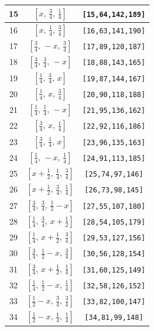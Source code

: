 \documentclass[fleqn,8pt]{jsarticle}
\begin{document}
\begin{longtable}{ccc}
15 & $\left[ x,\, \frac{3}{4},\, \frac{1}{4} \right]$ & {\tt [15,64,142,189]} \\ \hline
16 & $\left[ x,\, \frac{1}{4},\, \frac{3}{4} \right]$ & {\tt [16,63,141,190]} \\ \hline
17 & $\left[ \frac{3}{4},\, - x,\, \frac{3}{4} \right]$ & {\tt [17,89,120,187]} \\ \hline
18 & $\left[ \frac{3}{4},\, \frac{3}{4},\, - x \right]$ & {\tt [18,88,143,165]} \\ \hline
19 & $\left[ \frac{1}{4},\, \frac{3}{4},\, x \right]$ & {\tt [19,87,144,167]} \\ \hline
20 & $\left[ \frac{1}{4},\, x,\, \frac{3}{4} \right]$ & {\tt [20,90,118,188]} \\ \hline
21 & $\left[ \frac{1}{4},\, \frac{1}{4},\, - x \right]$ & {\tt [21,95,136,162]} \\ \hline
22 & $\left[ \frac{3}{4},\, x,\, \frac{1}{4} \right]$ & {\tt [22,92,116,186]} \\ \hline
23 & $\left[ \frac{3}{4},\, \frac{1}{4},\, x \right]$ & {\tt [23,96,135,163]} \\ \hline
24 & $\left[ \frac{1}{4},\, - x,\, \frac{1}{4} \right]$ & {\tt [24,91,113,185]} \\ \hline
25 & $\left[ x + \frac{1}{2},\, \frac{1}{4},\, \frac{3}{4} \right]$ & {\tt [25,74,97,146]} \\ \hline
26 & $\left[ x + \frac{1}{2},\, \frac{3}{4},\, \frac{1}{4} \right]$ & {\tt [26,73,98,145]} \\ \hline
27 & $\left[ \frac{3}{4},\, \frac{3}{4},\, \frac{1}{2} - x \right]$ & {\tt [27,55,107,180]} \\ \hline
28 & $\left[ \frac{1}{4},\, \frac{3}{4},\, x + \frac{1}{2} \right]$ & {\tt [28,54,105,179]} \\ \hline
29 & $\left[ \frac{1}{4},\, x + \frac{1}{2},\, \frac{3}{4} \right]$ & {\tt [29,53,127,156]} \\ \hline
30 & $\left[ \frac{3}{4},\, \frac{1}{2} - x,\, \frac{3}{4} \right]$ & {\tt [30,56,128,154]} \\ \hline
31 & $\left[ \frac{3}{4},\, x + \frac{1}{2},\, \frac{1}{4} \right]$ & {\tt [31,60,125,149]} \\ \hline
32 & $\left[ \frac{1}{4},\, \frac{1}{2} - x,\, \frac{1}{4} \right]$ & {\tt [32,58,126,152]} \\ \hline
33 & $\left[ \frac{1}{2} - x,\, \frac{3}{4},\, \frac{3}{4} \right]$ & {\tt [33,82,100,147]} \\ \hline
34 & $\left[ \frac{1}{2} - x,\, \frac{1}{4},\, \frac{1}{4} \right]$ & {\tt [34,81,99,148]} \\ \hline

\end{longtable}
\end{document}
